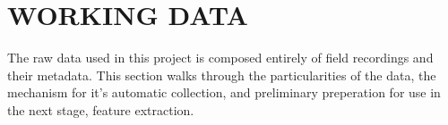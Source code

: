 \chapter{WORKING DATA}

The raw data used in this project is composed entirely of field recordings
and their metadata.
This section walks through the particularities of the data, the mechanism for
it's automatic collection, and preliminary preperation for use in the next
stage, feature extraction.

